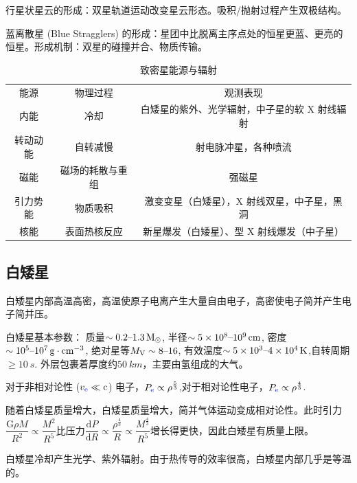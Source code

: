 \documentclass[../天体物理基础.tex]{subfiles}
\begin{document}
行星状星云的形成：双星轨道运动改变星云形态。吸积/抛射过程产生双极结构。

蓝离散星 (Blue Stragglers) 的形成：星团中比脱离主序点处的恒星更蓝、更亮的恒星。形成机制：双星的碰撞并合、物质传输。


\begin{table}[!htbp]
\centering
\caption{致密星能源与辐射}
\begin{tabular}{c c c}
\hline
能源 & 物理过程 & 观测表现\\
\cline{1-3}
内能 & 冷却 & 白矮星的紫外、光学辐射，中子星的软 X 射线辐射\\
\cline{1-3}
转动动能 & 自转减慢 & 射电脉冲星，各种喷流\\
\cline{1-3}
磁能 & 磁场的耗散与重组 & 强磁星\\
\cline{1-3}
引力势能 & 物质吸积 & 激变变星（白矮星），X 射线双星，中子星，黑洞\\
\cline{1-3}
核能 & 表面热核反应 & 新星爆发（白矮星）、\uppercase\expandafter{\romannumeral1}型 X 射线爆发（中子星）\\
\hline
\end{tabular}
\label{}
\end{table}


\subsection{白矮星}
白矮星内部高温高密，高温使原子电离产生大量自由电子，高密使电子简并产生电子简并压。

白矮星基本参数：
质量$\sim0.2\text{\textendash}1.3\,\unit{M_{\odot}}$, 半径$\sim5\times10^{8}\text{\textendash}10^{9}\,\unit{cm}$, 密度$\sim10^{5}\text{\textendash}10^{7}\,\unit{g\cdot cm^{-3}}$, 绝对星等$M_{\text{V}}\sim8\text{\textendash}16$, 有效温度$\sim5\times10^{3}\text{\textendash}4\times10^{4}\,\unit{K}$,自转周期$\ge\qty{10}{s}$. 外层包裹着厚度约$\qty{50}{km}$，主要由氢组成的大气。

对于非相对论性 ($v_{{\color{blue}{\ce{e}}}}\ll\mathrm{c}$) 电子，$P_{{\color{blue}{\ce{e}}}}\propto\rho^{\frac{5}{3}}$,对于相对论性电子，$P_{{\color{blue}{\ce{e}}}}\propto\rho^{\frac{4}{3}}$.

随着白矮星质量增大，白矮星质量增大，简并气体运动变成相对论性。此时引力$\dfrac{\mathrm{G}\rho{}M}{R^{2}}\propto{}\dfrac{M^{2}}{R^{5}}$比压力$\dfrac{\mathrm{d}P}{\mathrm{d}R}\propto{}\dfrac{\rho^{\frac{4}{3}}}{R}\propto{}\dfrac{M^{\frac{4}{3}}}{R^{5}}$增长得更快，因此白矮星有质量上限。

白矮星冷却产生光学、紫外辐射。由于热传导的效率很高，白矮星内部几乎是等温的。
\end{document}
